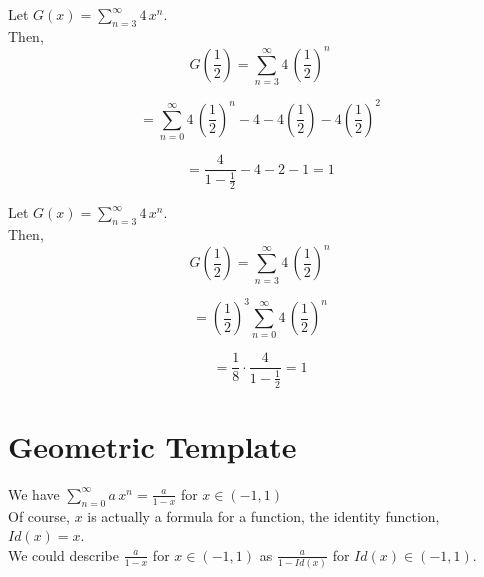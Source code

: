 \documentclass{ximera}
\begin{document}
\begin{example}


Let $G(x) = \sum\limits_{n=3}^{\infty} 4 \, x^n$. \\ 



Then, 
\[ G\left( \frac{1}{2} \right) = \sum\limits_{n=3}^{\infty} 4 \, \left( \frac {1}{2} \right)^n \]


\[ = \sum\limits_{n=0}^{\infty} 4 \, \left( \frac {1}{2} \right)^n  - 4 - 4 \left( \frac{1}{2} \right)  - 4 \left( \frac{1}{2} \right)^2    \]



\[
= \frac{4}{1-\frac{1}{2}} - 4 - 2 - 1 = 1
\]


\end{example}








\begin{example}


Let $G(x) = \sum\limits_{n=3}^{\infty} 4 \, x^n$. \\ 



Then, 
\[ G\left( \frac{1}{2} \right) = \sum\limits_{n=3}^{\infty} 4 \, \left( \frac {1}{2} \right)^n \]


\[ = \left( \frac{1}{2} \right)^3 \sum\limits_{n=0}^{\infty} 4 \, \left( \frac {1}{2} \right)^n \]

\[ =  \frac{1}{8} \cdot  \frac{4}{1-\frac{1}{2}} = 1 \]

\end{example}












\section{Geometric Template}


We have $\sum\limits_{n=0}^{\infty} a \, x^n = \frac{a}{1-x}$ for $x \in (-1, 1)$ \\

Of course, $x$ is actually a formula for a function, the identity function, $Id(x) = x$. \\


We could describe $\frac{a}{1-x}$ for $x \in (-1, 1)$ as $\frac{a}{1-Id(x)}$ for $Id(x) \in (-1, 1)$.
\end{document}
